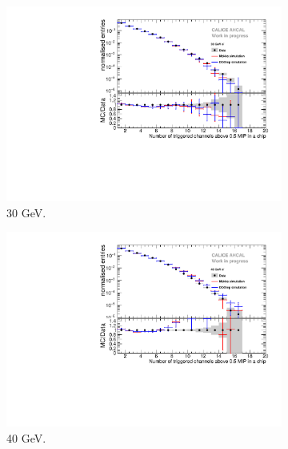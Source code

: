 \begin{figure}[htbp!]
\begin{subfigure}[t]{0.5\textwidth}
    \includegraphics[width=1\textwidth]{../Thesis_Plots/Timing/Electrons/Plots/Comparison_SimData_Electrons_nHits_30GeV.pdf}
    \caption{30 GeV.}\label{fig:elec_sim_data_nHits_30GeV}
  \end{subfigure}
  \hfill
  \begin{subfigure}[t]{0.5\textwidth}
    \centering
    \includegraphics[width=1\textwidth]{../Thesis_Plots/Timing/Electrons/Plots/Comparison_SimData_Electrons_nHits_40GeV.pdf}
    \caption{40 GeV.}\label{fig:elec_sim_data_nHits_40GeV}
  \end{subfigure}
  \hfill
  \begin{subfigure}[t]{0.5\textwidth}
    \centering

\end{subfigure}
\end{figure}
